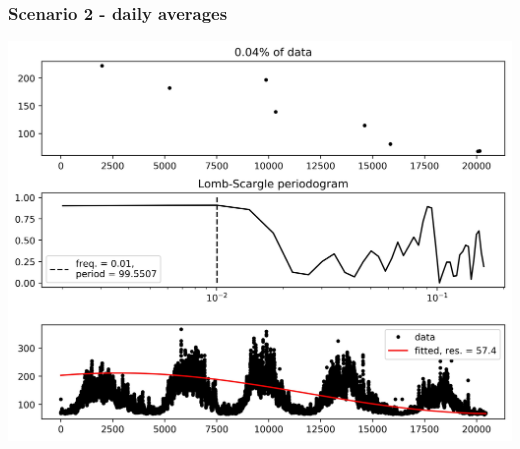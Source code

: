 \documentclass{beamer}
\begin{document}
\begin{frame}
\frametitle{Scenario 2 - daily averages}
\begin{center}
\includegraphics[scale=0.55]{../scripts/dataset1/periodograms_ny2.0_model1_pg0.9996.jpg}
\end{center}
\end{frame}
\end{document}
